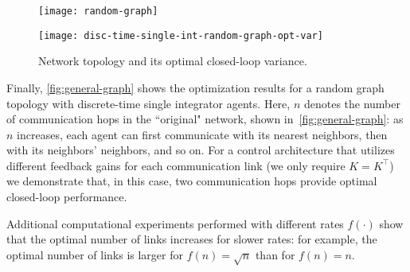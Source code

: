 \begin{figure}
	\centering
	\begin{minipage}[l]{.5\linewidth}
		\centering
		\texttt{[image: random-graph]}
	\end{minipage}%
	\begin{minipage}[r]{.5\linewidth}
		\centering
		\texttt{[image: disc-time-single-int-random-graph-opt-var]}
	\end{minipage}
	\caption{Network topology and its optimal {closed-loop} variance.}
	\label{fig:general-graph}
\end{figure}

Finally,
\autoref{fig:general-graph} shows the optimization results for a random graph topology with discrete-time single integrator agents. %
Here, $ n $ denotes the number of communication hops in the ``original" network, shown in~\autoref{fig:general-graph}:
as $ n $ increases, each agent can first communicate with its nearest neighbors,
then with its neighbors' neighbors, and so on. For a control architecture that utilizes different feedback gains for each communication link
	(\ie we only require $ K = K^\top $) we demonstrate that, in this case, two communication hops provide optimal closed-loop performance. %

Additional computational experiments performed with different rates $ f(\cdot) $ show that the optimal number of links increases for slower rates: 
for example, 
the optimal number of links is larger for $ f(n) = \sqrt{n} $ than for $ f(n) = n $. 
